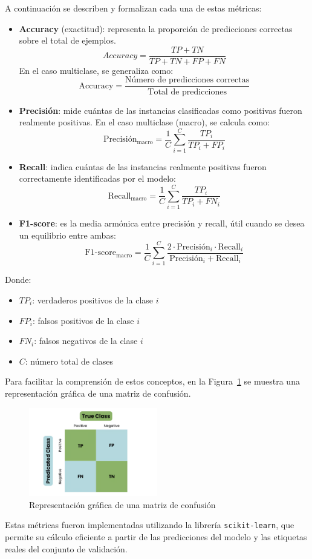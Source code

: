 A continuación se describen y formalizan cada una de estas métricas:

\begin{itemize}
      \item \textbf{Accuracy} (exactitud): representa la proporción de predicciones correctas sobre el total de ejemplos.
            $$
                  Accuracy = \frac{TP + TN}{TP + TN + FP + FN}
            $$
            En el caso multiclase, se generaliza como:
            $$
                  \mathrm{Accuracy} = \frac{\text{Número de predicciones correctas}}{\text{Total de predicciones}}
            $$

      \item \textbf{Precisión}: mide cuántas de las instancias clasificadas como positivas fueron realmente positivas.
            En el caso multiclase (macro), se calcula como:
            $$
                  \text{Precisión}_{\text{macro}} = \frac{1}{C} \sum_{i=1}^{C} \frac{TP_i}{TP_i + FP_i}
            $$

      \item \textbf{Recall}: indica cuántas de las instancias realmente positivas fueron correctamente identificadas por el modelo:
            $$
                  \mathrm{Recall}_{\text{macro}} = \frac{1}{C} \sum_{i=1}^{C} \frac{TP_i}{TP_i + FN_i}
            $$

      \item \textbf{F1-score}: es la media armónica entre precisión y recall, útil cuando se desea un equilibrio entre ambas:
            $$
                  \mathrm{F1\text{-}score}_{\text{macro}} = \frac{1}{C} \sum_{i=1}^{C} \frac{2 \cdot \text{Precisión}_i \cdot \text{Recall}_i}{\text{Precisión}_i + \text{Recall}_i}
            $$
\end{itemize}

Donde:
\begin{itemize}
      \item $TP_i$: verdaderos positivos de la clase $i$
      \item $FP_i$: falsos positivos de la clase $i$
      \item $FN_i$: falsos negativos de la clase $i$
      \item $C$: número total de clases
\end{itemize}

Para facilitar la comprensión de estos conceptos, en la Figura~\ref{fig:matriz-confusion} se muestra una representación gráfica de una matriz de confusión.
\begin{figure}[H]
      \centering
      \includegraphics[width=0.5\textwidth]{imagenes/matriz-de-confusion.png}
      \caption{Representación gráfica de una matriz de confusión}
      \label{fig:matriz-confusion}
\end{figure}

Estas métricas fueron implementadas utilizando la librería \texttt{scikit-learn}, que permite su cálculo eficiente a partir de las
predicciones del modelo y las etiquetas reales del conjunto de validación.
